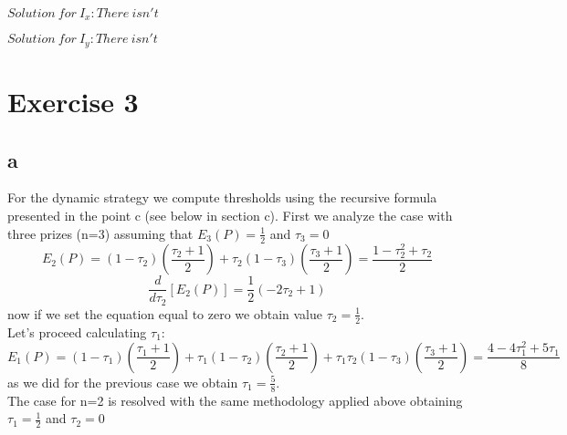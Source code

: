 \documentclass{article}
\begin{document}
$Solution\ for\ I_{x}: There\ isn't$


$Solution\ for\ I_{y}: There\ isn't$






\newpage
\section{Exercise 3}
\subsection{a}
For the dynamic strategy we compute thresholds using the recursive formula presented in the point c (see below in section c).
First we analyze the case with three prizes (n=3) assuming that $E_{3}(P)=\frac{1}{2}$ and $\tau_{3}=0$
\begin{equation}
E_{2}(P)=(1-\tau_{2})(\frac{\tau_{2}+1}{2})+\tau_{2}(1-\tau_{3})(\frac{\tau_{3}+1}{2})=\frac{1-\tau_{2}^{2}+\tau_{2}}{2}
\end{equation}
\begin{equation}
\frac{d}{d\tau_{2}}[E_{2}(P)]=\frac{1}{2}(-2\tau_{2}+1)
\end{equation}
now if we set the equation equal to zero we obtain value $\tau_{2} =\frac{1}{2}$.\\
Let's proceed calculating $\tau_{1}$:
\begin{equation}
E_{1}(P)= (1-\tau_{1})(\frac{\tau_{1}+1}{2})+\tau_{1}(1-\tau_{2})(\frac{\tau_{2}+1}{2})+\tau_{1}\tau_{2}(1-\tau_{3})(\frac{\tau_{3}+1}{2})=\frac{4-4\tau_{1}^{2}+5\tau_{1}}{8}
\end{equation}
as we did for the previous case we obtain $\tau_{1}=\frac{5}{8}$.\\
The case for n=2 is resolved with the same methodology applied above obtaining $\tau_{1}=\frac{1}{2}$ and $\tau_{2}=0$
\end{document}
